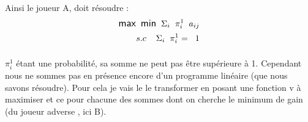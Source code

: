\documentclass[a4paper, 12pt, twoside]{article}
\begin{document}
{Ainsi le joueur A, doit résoudre :
\begin{align*}
\large {\textsf{max} \hspace{0.2 cm} \textsf{min} \hspace{0.2 cm} \Sigma_{i}\hspace{0.2 cm} \pi_{i}^{1}\hspace{0.2 cm} a _{ij} } \\ s.c \hspace{0,4 cm}
\large {\Sigma_{i}\hspace{0,2 cm}\pi_{i}^{1} = \hspace{0,2 cm}1}
\end{align*}
\paragraph*{}{$\pi_{i}^{1}$ étant une probabilité, sa somme ne peut pas être supérieure à 1. Cependant nous ne sommes pas en présence encore d'un programme linéaire (que nous savons résoudre). Pour cela je vais le  le transformer  en posant une fonction  \textsf{v} à maximiser et ce pour chacune des sommes dont on cherche le minimum de gain (du joueur adverse , ici B)}. \newline 

}
\end{document}

